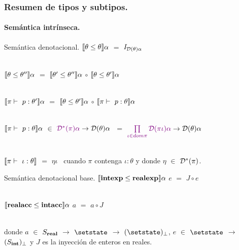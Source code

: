 \documentclass{beamer} %
\begin{document}
\begin{frame}[shrink=1]
\frametitle{Resumen de tipos y subtipos.}
\framesubtitle{Sem\'antica intr\'inseca.}
\begin{block}{Sem\'antica denotacional.}\small
$\llbracket \theta \leq \theta \rrbracket \alpha$ $=$ $\it{I}_{\mathcal{D}(\theta)\alpha}$\\
\

$\llbracket \theta \leq \theta'' \rrbracket \alpha$ $=$ $\llbracket \theta' \leq \theta'' \rrbracket\alpha$ $\circ$ $\llbracket \theta \leq \theta' \rrbracket\alpha$\\
\

$\llbracket \pi \vdash \ p:\theta' \rrbracket \alpha$ $=$ $\llbracket \theta \leq \theta' \rrbracket\alpha$ $\circ$ $\llbracket \pi \vdash \ p:\theta \rrbracket \alpha$\\
\

$\llbracket \pi \vdash \ p:\theta \rrbracket \alpha$ $\in$ $\textcolor{violet}{\mathcal{D}^{*}(\pi)\alpha} \rightarrow \mathcal{D}(\theta)\alpha$ $\ =$ 
$\textcolor{violet}{\prod\limits_{\iota \in dom \pi} \mathcal{D}(\pi\iota)\alpha} \rightarrow \mathcal{D}(\theta)\alpha$\\
\

$\semBrcks{\pi \vdash \ \iota:\theta}$ $=$ $\eta\iota$ \ cuando $\pi$ contenga $\iota:\theta$ y donde $\eta$ $\in$ $\mathcal{D}^* (\pi)$.
\end{block}

\begin{block}{Sem\'antica denotacional base.}\small
$\llbracket \textbf{intexp} \leq \textbf{realexp} \rrbracket \alpha$ $e$ $=$ $J \circ e$\\
\

$\llbracket \textbf{realacc} \leq \textbf{intacc} \rrbracket \alpha$ $a$ $=$ $a \circ J$\\
\

donde $a$ $\in$ $S_{\bf{real}}$ $\rightarrow$ $\setstate$ $\rightarrow$ $(\setstate)_\bot$, 
$e$ $\in$ $\setstate$ $\rightarrow$ $(S_{\bf{int}})_\bot$ y $J$ es la inyecci\'on de enteros en reales.
\end{block}
\end{frame}
\end{document}
